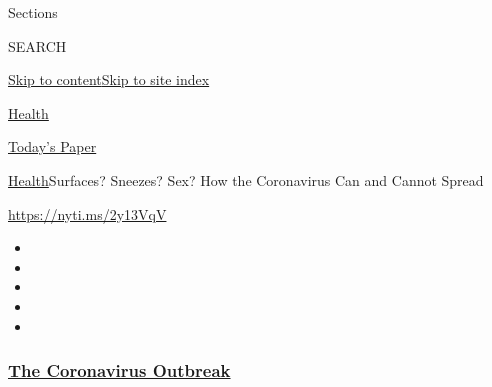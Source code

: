 Sections

SEARCH

\protect\hyperlink{site-content}{Skip to
content}\protect\hyperlink{site-index}{Skip to site index}

\href{https://www.nytimes3xbfgragh.onion/section/health}{Health}

\href{https://myaccount.nytimes3xbfgragh.onion/auth/login?response_type=cookie\&client_id=vi}{}

\href{https://www.nytimes3xbfgragh.onion/section/todayspaper}{Today's
Paper}

\href{/section/health}{Health}\textbar{}Surfaces? Sneezes? Sex? How the
Coronavirus Can and Cannot Spread

\url{https://nyti.ms/2y13VqV}

\begin{itemize}
\item
\item
\item
\item
\item
\end{itemize}

\hypertarget{the-coronavirus-outbreak}{%
\subsubsection{\texorpdfstring{\href{https://www.nytimes3xbfgragh.onion/news-event/coronavirus?name=styln-coronavirus-national\&region=TOP_BANNER\&block=storyline_menu_recirc\&action=click\&pgtype=Article\&impression_id=450a5010-f1e5-11ea-852f-a350b3d288e2\&variant=undefined}{The
Coronavirus
Outbreak}}{The Coronavirus Outbreak}}\label{the-coronavirus-outbreak}}

